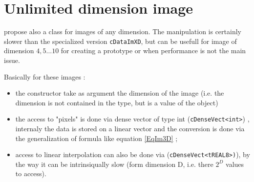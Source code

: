 
\section{Unlimited dimension image}
\label{UlimDimIm}

\PPP propose also a class for images of any dimension. The manipulation is
certainly slower than the specialized version  {\tt cDataImXD}, but can be usefull
for image of dimension $4,5 \dots 10$ for creating a prototype or when performance
is not the main issue.

Basically for these images :

\begin{itemize}
    \item  the constructor take as argument the dimension of the image (i.e. the dimension
	    is not contained in the type, but is a value of the object)

    \item  the access to "pixels" is done via dense vector of type int ({\tt cDenseVect<int>}) ,
	   internaly the data is stored on a linear vector and the conversion is done via
           the generalization of formula like equation \ref{EqIm3D} ;

    \item  access to linear interpolation can also be done via ({\tt cDenseVect<tREAL8>)}), by the
	    way it can be intrinsiqually slow (form dimension D, i.e. there $2^D$ values to access).
\end{itemize}








